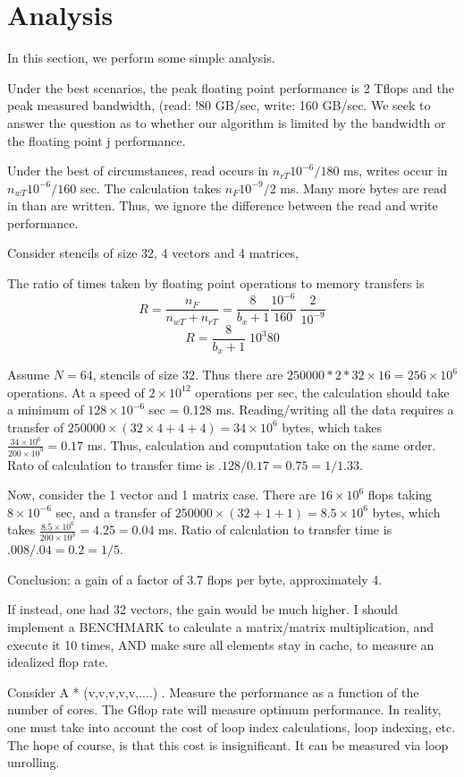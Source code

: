 \section{Analysis}
In this section, we perform some simple analysis. 

Under the best scenarios, the peak floating point performance is 2 Tflops and the peak measured bandwidth, (read: 
!80 GB/sec, write: 160 GB/sec. We seek to answer the question as to whether our algorithm is limited by the bandwidth or the floating point j
performance. 

Under the best of circumstances, read occurs in $n_{rT}10^{-6}/180$ ms, writes occur in $n_{wT}10^{-6}/160$ sec. 
The calculation takes $n_F 10^{-9}/2$ ms. Many more bytes are read in than are written. Thus, we ignore the difference between the read and write 
performance. 

Consider stencils of size 32, 4 vectors and 4 matrices, 

The ratio of times taken by floating point operations to memory transfers is
$$
R = \frac{n_F}{n_{wT}+n_{rT}} = \frac{8}{b_x+1} \frac{10^{-6}}{160} \; \frac{2}{10^{-9}}
$$
$$
R = \frac{8}{b_x+1}  \; 10^3 80
$$

Assume $N=64$, stencils of size 32. Thus there are $250000*2*32\times 16=256 \times 10^6$ operations. At a speed of $2\times 10^{12}$ operations per sec, 
the calculation should take a minimum of $128\times 10^{-6}$ sec = 0.128 ms. Reading/writing all the data requires a transfer of 
$250000\times (32 \times 4 + 4 + 4) = 34\times 10^6$ bytes, which takes $\frac{34\times 10^6}{200\times 10^9}=0.17$ ms. 
Thus, calculation and computation take on the same order. 
Rato of calculation to transfer time is $.128/0.17=0.75 = 1/1.33$. 

Now, consider the 1 vector and 1 matrix case. There are $16\times 10^6$ flops taking $8\times 10^{-6}$ sec, and a transfer of 
$250000\times (32+1+1) =8.5\times 10^6$ bytes, which takes $\frac{8.5\times 10^6}{200\times 10^9}=4.25=0.04$ ms. 
Ratio of calculation to transfer time is $.008/.04=0.2=1/5$. 

Conclusion: a gain of a factor of 3.7 flops per byte, approximately 4. 

If instead, one had 32 vectors, the gain would be much higher. I should implement a BENCHMARK to calculate a matrix/matrix multiplication, 
and execute it 10 times, AND make sure all elements stay in cache, to measure an idealized flop rate. 

Consider A * (v,v,v,v,v,....) . Measure the performance as a function of the number of cores. The Gflop rate will measure optimum performance. 
In reality, one must take into account the cost of loop index calculations, loop indexing, etc. The hope of course, is that this cost is 
insignificant. It can be measured via loop unrolling. 



